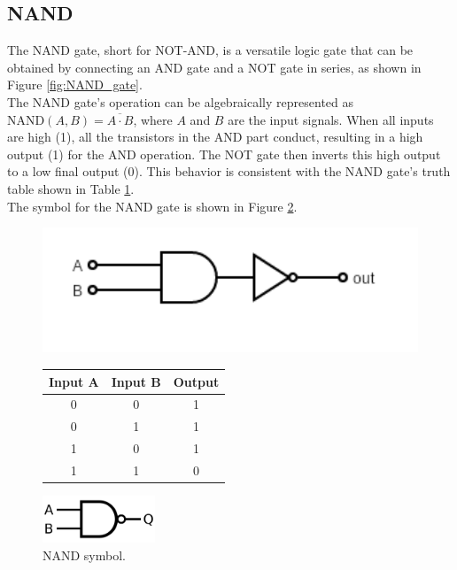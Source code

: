\subsection{NAND}
    The NAND gate, short for NOT-AND, is a versatile logic gate that can be obtained by connecting an AND gate and a NOT gate in series, as shown in Figure \ref{fig:NAND_gate}. \\
    The NAND gate's operation can be algebraically represented as $\text{NAND}(A, B) = \overline{A \cdot B}$, where $A$ and $B$ are the input signals.
    When all inputs are high (1), all the transistors in the AND part conduct, resulting in a high output (1) for the AND operation. 
    The NOT gate then inverts this high output to a low final output (0).
    This behavior is consistent with the NAND gate's truth table shown in Table \ref{tab:NAND_table}. \\
    The symbol for the NAND gate is shown in Figure \ref{fig:NAND_sym}. 

    \begin{figure}[H]   
        \begin{minipage}{0.5\textwidth}
            \centering
            \includegraphics[width=1.1\textwidth]{figures/circuits/NAND.png}
            \label{fig:NAND_gate} 
        \end{minipage}
        \begin{minipage}{0.5\textwidth}
            \centering
            \begin{tabular}{|c|c|c|}
                \hline
                Input A & Input B & Output \\
                \hline
                0 & 0 & 1 \\
                0 & 1 & 1 \\
                1 & 0 & 1 \\
                1 & 1 & 0 \\
                \hline
            \end{tabular}
            \label{tab:NAND_table}
        \end{minipage}
	\end{figure}

    \begin{figure}[H]
	    \centering
	    \includegraphics[width=0.3\textwidth]{figures/symbols/NAND.png}
	    \caption{NAND symbol.}
	    \label{fig:NAND_sym} 
	\end{figure}